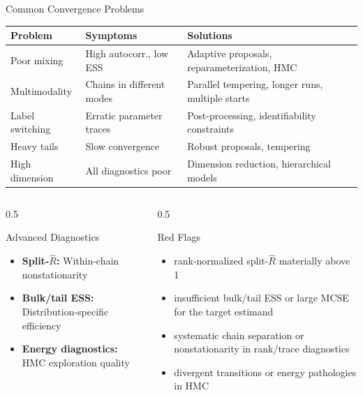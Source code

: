 \documentclass[aspectratio=169,11pt]{beamer}
\begin{document}
\begin{frame}{Common Convergence Problems}
\begin{table}
\centering
\begin{tabular}{p{2.5cm}p{3cm}p{5cm}}
\toprule
\textbf{Problem} & \textbf{Symptoms} & \textbf{Solutions} \\
\midrule
Poor mixing & High autocorr., low ESS & Adaptive proposals, reparameterization, HMC \\
\midrule
Multimodality & Chains in different modes & Parallel tempering, longer runs, multiple starts \\
\midrule
Label switching & Erratic parameter traces & Post-processing, identifiability constraints \\
\midrule
Heavy tails & Slow convergence & Robust proposals, tempering \\
\midrule
High dimension & All diagnostics poor & Dimension reduction, hierarchical models \\
\bottomrule
\end{tabular}
\end{table}

\vspace{0.3cm}
\begin{columns}
\begin{column}{0.5\textwidth}
\begin{block}{Advanced Diagnostics}
\begin{itemize}
\item \textbf{Split-$\hat{R}$:} Within-chain nonstationarity
\item \textbf{Bulk/tail ESS:} Distribution-specific efficiency
\item \textbf{Energy diagnostics:} HMC exploration quality
\end{itemize}
\end{block}
\end{column}
\begin{column}{0.5\textwidth}
\begin{alertblock}{Red Flags}
\begin{itemize}
\item rank-normalized split-$\hat R$ materially above 1
\item insufficient bulk/tail ESS or large MCSE for the target estimand
\item systematic chain separation or nonstationarity in rank/trace diagnostics
\item divergent transitions or energy pathologies in HMC
\end{itemize}
\end{alertblock}
\end{column}
\end{columns}
\end{frame}
\end{document}
